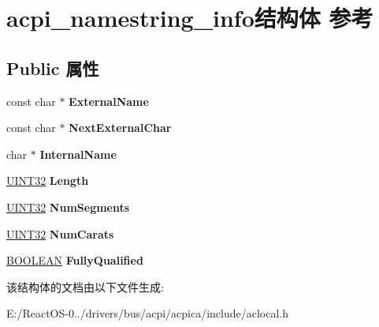 \hypertarget{structacpi__namestring__info}{}\section{acpi\+\_\+namestring\+\_\+info结构体 参考}
\label{structacpi__namestring__info}
\subsection*{Public 属性}
\begin{DoxyCompactItemize}
\item 
\mbox{\label{structacpi__namestring__info_a8aaf1205f3f2fde3bcd1ea29153f5a13}} 
const char $\ast$ {\bfseries External\+Name}
\item 
\mbox{\label{structacpi__namestring__info_a67af9a8e59d79d800618554a4a9f8e5f}} 
const char $\ast$ {\bfseries Next\+External\+Char}
\item 
\mbox{\label{structacpi__namestring__info_a6d2d8214096bc0a519a81bbb1825c964}} 
char $\ast$ {\bfseries Internal\+Name}
\item 
\mbox{\label{structacpi__namestring__info_a042cc620f0cece22a7238efd7664b38b}} 
\hyperlink{_processor_bind_8h_ae1e6edbbc26d6fbc71a90190d0266018}{U\+I\+N\+T32} {\bfseries Length}
\item 
\mbox{\label{structacpi__namestring__info_aa21d00467bcf5f13b9a4197dc889817d}} 
\hyperlink{_processor_bind_8h_ae1e6edbbc26d6fbc71a90190d0266018}{U\+I\+N\+T32} {\bfseries Num\+Segments}
\item 
\mbox{\label{structacpi__namestring__info_a8c9dcced1609d71fda46d3458ee456da}} 
\hyperlink{_processor_bind_8h_ae1e6edbbc26d6fbc71a90190d0266018}{U\+I\+N\+T32} {\bfseries Num\+Carats}
\item 
\mbox{\label{structacpi__namestring__info_acd448715a0daee929739df060e076035}} 
\hyperlink{_processor_bind_8h_a112e3146cb38b6ee95e64d85842e380a}{B\+O\+O\+L\+E\+AN} {\bfseries Fully\+Qualified}
\end{DoxyCompactItemize}


该结构体的文档由以下文件生成\+:\begin{DoxyCompactItemize}
\item 
E\+:/\+React\+O\+S-\/0../drivers/bus/acpi/acpica/include/aclocal.\+h\end{DoxyCompactItemize}
